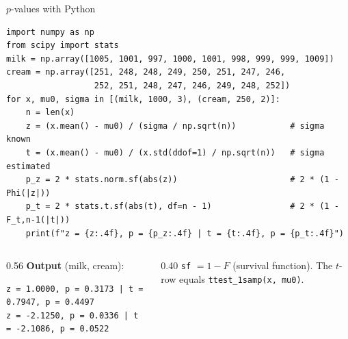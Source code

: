 \documentclass[aspectratio=169,11pt]{beamer}
\begin{document}
\begin{frame}[fragile]{$p$-values with Python}
\begin{lstlisting}
import numpy as np
from scipy import stats
milk = np.array([1005, 1001, 997, 1000, 1001, 998, 999, 999, 1009])
cream = np.array([251, 248, 248, 249, 250, 251, 247, 246,
                  252, 251, 248, 247, 246, 249, 248, 252])
for x, mu0, sigma in [(milk, 1000, 3), (cream, 250, 2)]:
    n = len(x)
    z = (x.mean() - mu0) / (sigma / np.sqrt(n))           # sigma known
    t = (x.mean() - mu0) / (x.std(ddof=1) / np.sqrt(n))   # sigma estimated
    p_z = 2 * stats.norm.sf(abs(z))                       # 2 * (1 - Phi(|z|))
    p_t = 2 * stats.t.sf(abs(t), df=n - 1)                # 2 * (1 - F_t,n-1(|t|))
    print(f"z = {z:.4f}, p = {p_z:.4f} | t = {t:.4f}, p = {p_t:.4f}")
\end{lstlisting}
  \begin{columns}[T]
    \begin{column}{0.56\textwidth}
      \textbf{Output} (milk, cream):
\begin{lstlisting}[style=Pyout]
z = 1.0000, p = 0.3173 | t = 0.7947, p = 0.4497
z = -2.1250, p = 0.0336 | t = -2.1086, p = 0.0522
\end{lstlisting}
    \end{column}
    \begin{column}{0.40\textwidth}
      \footnotesize \texttt{sf} $=1-F$ (survival function). The $t$-row
      equals \texttt{ttest\_1samp(x, mu0)}.
    \end{column}
  \end{columns}
\end{frame}
\end{document}
